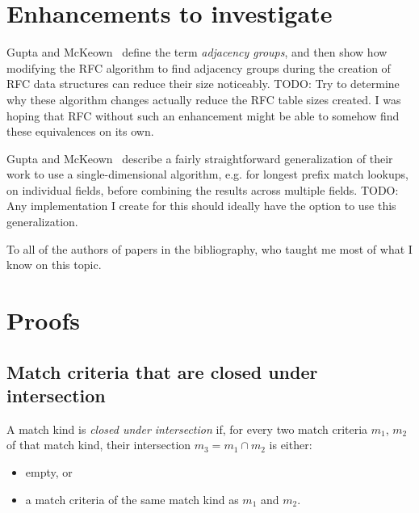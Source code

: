 \documentclass[acmsmall]{acmart}
\newcommand{\todo}[1]{}
\renewcommand{\todo}[1]{{\color{red} TODO: {#1}}}
\begin{document}
\section{Enhancements to investigate}

Gupta and McKeown~\cite[Sec. 7.1]{GM1999a} define the term
{\em adjacency groups}, and then show how modifying the RFC algorithm
to find adjacency groups during the creation of RFC data structures
can reduce their size noticeably.
\todo{Try to determine why these algorithm changes actually reduce
the RFC table sizes created.  I was hoping that RFC without such
an enhancement might be able to somehow find these equivalences on its own.}

Gupta and McKeown~\cite[Sec. 7]{GM1999a} describe a fairly
straightforward generalization of their work to use a single-dimensional
algorithm, e.g. for longest prefix match lookups, on individual fields,
before combining the results across multiple fields.
\todo{Any implementation I create for this should ideally have the option
to use this generalization.}

\begin{acks}
To all of the authors of papers in the bibliography, who taught
me most of what I know on this topic.
\end{acks}




\appendix

\section{Proofs}

\subsection{Match criteria that are closed under intersection}

\begin{definition}
\label{defn:closedunderintersection}
A match kind is {\em closed under intersection} if,
for every two match criteria $m_1$, $m_2$ of that match kind,
their intersection $m_3 = m_1 \cap m_2$ is either:
\begin{itemize}
\item empty, or
\item a match criteria of the same match kind as $m_1$ and $m_2$.
\end{itemize}
\end{definition}
\end{document}
